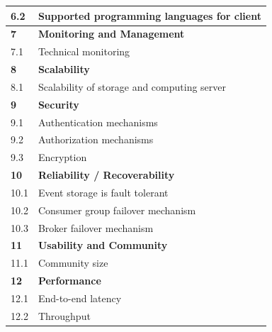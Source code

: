 \begin{table}[h]
\begin{tabular}{|l|l|}
		6.2          & Supported programming languages for client               \\ \hline
		\textbf{7}   & \textbf{Monitoring and Management}                       \\ \hline
		7.1          & Technical monitoring                                     \\ \hline
		\textbf{8}   & \textbf{Scalability}                                     \\ \hline
		8.1          & Scalability of storage and computing server              \\ \hline
		\textbf{9}   & \textbf{Security}                                        \\ \hline
		9.1          & Authentication mechanisms                                \\ \hline
		9.2          & Authorization mechanisms                                 \\ \hline
		9.3          & Encryption                                               \\ \hline
		\textbf{10}  & \textbf{Reliability / Recoverability}                    \\ \hline
		10.1         & Event storage is fault tolerant                          \\ \hline
		10.2         & Consumer group failover mechanism                        \\ \hline
		10.3         & Broker failover mechanism                                \\ \hline
		\textbf{11}  & \textbf{Usability and Community}                         \\ \hline
		11.1         & Community size                                           \\ \hline
		\textbf{12}  & \textbf{Performance}                                     \\ \hline
		12.1         & End-to-end latency                                       \\ \hline
		12.2         & Throughput                                               \\ \hline
	\end{tabular}
\end{table}




